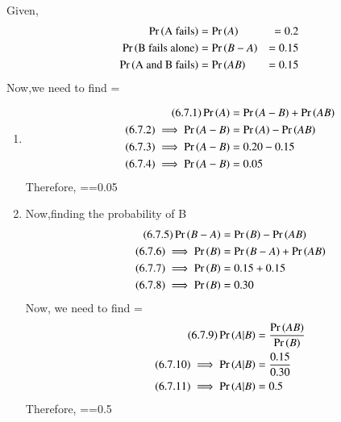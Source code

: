 Given,
\begin{align*}
\Pr\left(\text {A fails}\right)&=\Pr\left(A\right)&=0.2\\
\Pr\left(\text{B fails alone}\right)&=\Pr\left(B-A\right)&=0.15\\
\Pr\left(\text{A and B fails}\right)&=\Pr\left(AB\right)&=0.15\\
\end{align*}
 Now,we need to find =
\begin{enumerate}
\item
\begin{align}
    \tag{6.7.1}
    \Pr\left(A\right)&=\Pr\left(A-B\right)+\Pr\left(AB\right)\\
    \tag{6.7.2}
    \implies \Pr\left(A-B\right)&=\Pr\left(A\right)-\Pr\left(AB\right)\\
    \tag{6.7.3}
    \implies \Pr\left(A-B\right)&=0.20-0.15\\
    \tag{6.7.4}
    \implies \Pr\left(A-B\right)&=0.05
\end{align}
Therefore, ==0.05
\item
Now,finding the probability of B
\begin{align}
    \tag{6.7.5}
    \Pr\left(B-A\right)&=\Pr\left(B\right)-\Pr\left(AB\right)\\
    \tag{6.7.6}
    \implies \Pr\left(B\right)&=\Pr\left(B-A\right)+\Pr\left(AB\right)\\
    \tag{6.7.7}
    \implies \Pr\left(B\right)&=0.15+0.15\\
    \tag{6.7.8}
    \implies \Pr\left(B\right)&=0.30
\end{align}
Now, we need to find =
\begin{align}
    \tag{6.7.9}
    \Pr\left(A|B\right)&=\frac{\Pr\left(AB\right)}{\Pr\left(B\right)}\\
    \tag{6.7.10}
    \implies \Pr\left(A|B\right)&=\frac{0.15}{0.30}\\
    \tag{6.7.11}
    \implies \Pr\left(A|B\right)&=0.5
\end{align}
Therefore, ==0.5
\end{enumerate}